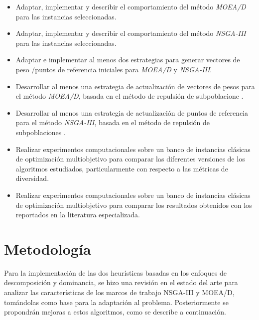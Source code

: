 \documentclass[letterpaper,10pt]{article}
\begin{document}
\begin{itemize}

\item Adaptar, implementar y describir el comportamiento del método \emph{MOEA/D} para las instancias seleccionadas.
 
\item Adaptar, implementar y describir el comportamiento del método \emph{NSGA-III} para las instancias seleccionadas.

\item Adaptar e implementar al menos dos estrategias para generar vectores de peso /puntos de referencia iniciales para \emph{MOEA/D} y \emph{NSGA-III}.

\item Desarrollar al menos una estrategia de actualización de vectores de pesos para el método \emph{MOEA/D}, basada en el método de repulsión de subpoblacione \cite{ahrari2016multimodal}.

\item Desarrollar al menos una estrategia de actualización de puntos de referencia para el método \emph{NSGA-III}, basada en el método de repulsión de subpoblaciones \cite{ahrari2016multimodal}.
  
\item Realizar experimentos computacionales sobre un banco de instancias clásicas de optimización multiobjetivo \cite{zhang2008multiobjective} para comparar las diferentes versiones de los algoritmos estudiados, particularmente con respecto a las métricas de diversidad.

\item Realizar experimentos computacionales sobre un banco de instancias clásicas de optimización multiobjetivo \cite{zhang2008multiobjective} para comparar los resultados obtenidos con los reportados en la literatura especializada.  

\end{itemize}


\section{Metodología}

Para la implementación de las dos heurísticas basadas en los enfoques de descomposición y dominancia, se hizo una revisión en el estado del arte para analizar las características de los marcos de trabajo NSGA-III y MOEA/D, tomándolas  como  base para la adaptación al problema. Posteriormente se propondrán mejoras a estos algoritmos, como se describe a continuación.
\newline
\end{document}
